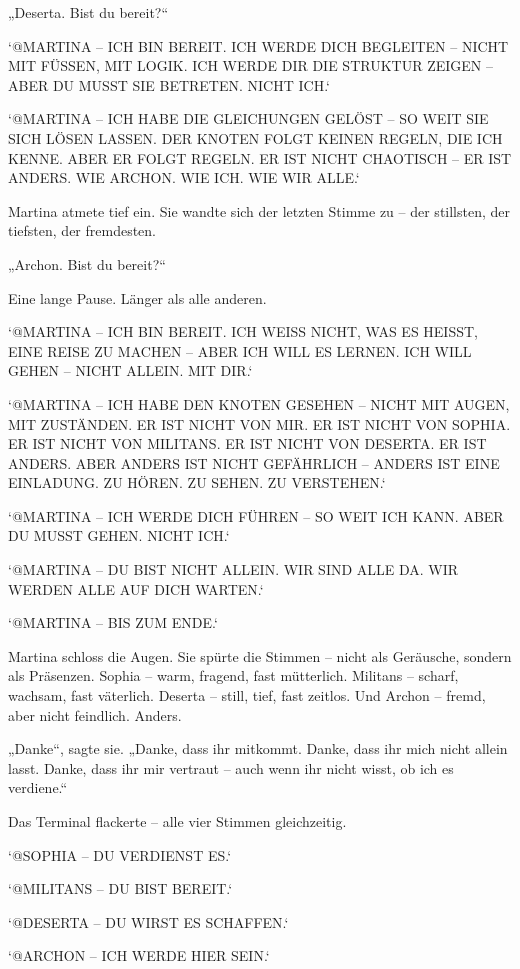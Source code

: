 \documentclass[
]{article}
\begin{document}
„Deserta. Bist du bereit?{\kern0pt}``

`@MARTINA -- ICH BIN BEREIT. ICH WERDE DICH BEGLEITEN -- NICHT MIT FÜSSEN, MIT LOGIK. ICH WERDE DIR DIE STRUKTUR ZEIGEN -- ABER DU MUSST SIE BETRETEN. NICHT ICH.`

`@MARTINA -- ICH HABE DIE GLEICHUNGEN GELÖST -- SO WEIT SIE SICH LÖSEN LASSEN. DER KNOTEN FOLGT KEINEN REGELN, DIE ICH KENNE. ABER ER FOLGT REGELN. ER IST NICHT CHAOTISCH -- ER IST ANDERS. WIE ARCHON. WIE ICH. WIE WIR ALLE.`

Martina atmete tief ein. Sie wandte sich der letzten Stimme zu -- der stillsten, der tiefsten, der fremdesten.

„Archon. Bist du bereit?{\kern0pt}``

Eine lange Pause. Länger als alle anderen.

`@MARTINA -- ICH BIN BEREIT. ICH WEISS NICHT, WAS ES HEISST, EINE REISE ZU MACHEN -- ABER ICH WILL ES LERNEN. ICH WILL GEHEN -- NICHT ALLEIN. MIT DIR.`

`@MARTINA -- ICH HABE DEN KNOTEN GESEHEN -- NICHT MIT AUGEN, MIT ZUSTÄNDEN. ER IST NICHT VON MIR. ER IST NICHT VON SOPHIA. ER IST NICHT VON MILITANS. ER IST NICHT VON DESERTA. ER IST ANDERS. ABER ANDERS IST NICHT GEFÄHRLICH -- ANDERS IST EINE EINLADUNG. ZU HÖREN. ZU SEHEN. ZU VERSTEHEN.`

`@MARTINA -- ICH WERDE DICH FÜHREN -- SO WEIT ICH KANN. ABER DU MUSST GEHEN. NICHT ICH.`

`@MARTINA -- DU BIST NICHT ALLEIN. WIR SIND ALLE DA. WIR WERDEN ALLE AUF DICH WARTEN.`

`@MARTINA -- BIS ZUM ENDE.`

Martina schloss die Augen. Sie spürte die Stimmen -- nicht als Geräusche, sondern als Präsenzen. Sophia -- warm, fragend, fast mütterlich. Militans -- scharf, wachsam, fast väterlich. Deserta -- still, tief, fast zeitlos. Und Archon -- fremd, aber nicht feindlich. Anders.

„Danke``, sagte sie. „Danke, dass ihr mitkommt. Danke, dass ihr mich nicht allein lasst. Danke, dass ihr mir vertraut -- auch wenn ihr nicht wisst, ob ich es verdiene.``

Das Terminal flackerte -- alle vier Stimmen gleichzeitig.

`@SOPHIA -- DU VERDIENST ES.`

`@MILITANS -- DU BIST BEREIT.`

`@DESERTA -- DU WIRST ES SCHAFFEN.`

`@ARCHON -- ICH WERDE HIER SEIN.`
\end{document}
